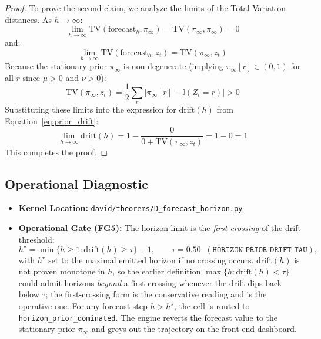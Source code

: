 \documentclass[11pt,a4paper]{article}
\begin{document}
\begin{proof}
To prove the second claim, we analyze the limits of the Total Variation distances. As $h \to \infty$:
\[
\lim_{h \to \infty} \text{TV}(\text{forecast}_h, \pi_\infty) = \text{TV}(\pi_\infty, \pi_\infty) = 0
\]
and:
\[
\lim_{h \to \infty} \text{TV}(\text{forecast}_h, z_t) = \text{TV}(\pi_\infty, z_t)
\]
Because the stationary prior $\pi_\infty$ is non-degenerate (implying $\pi_\infty[r] \in (0, 1)$ for all $r$ since $\mu > 0$ and $\nu > 0$):
\[
\text{TV}(\pi_\infty, z_t) = \frac{1}{2} \sum_{r} |\pi_\infty[r] - \mathbb{I}(Z_t=r)| > 0
\]
Substituting these limits into the expression for $\text{drift}(h)$ from Equation~\eqref{eq:prior_drift}:
\[
\lim_{h \to \infty} \text{drift}(h) = 1 - \frac{0}{0 + \text{TV}(\pi_\infty, z_t)} = 1 - 0 = 1
\]
This completes the proof.
\end{proof}

\subsection{Operational Diagnostic}
\begin{itemize}
    \item \textbf{Kernel Location:} \href{file:///Users/arbenlila/development/david/canonical/david/theorems/D_forecast_horizon.py}{\texttt{david/theorems/D\_forecast\_horizon.py}}
    \item \textbf{Operational Gate (FG5):} The horizon limit is the \emph{first crossing} of the drift threshold: %
    \[
    h^\star = \min\{ h \ge 1 : \text{drift}(h) \ge \tau \} - 1, \qquad \tau = 0.50 \;\; (\texttt{HORIZON\_PRIOR\_DRIFT\_TAU}), %
    \]
    with $h^\star$ set to the maximal emitted horizon if no crossing occurs. $\text{drift}(h)$ is not proven monotone in $h$, so the earlier definition $\max\{h : \text{drift}(h) < \tau\}$ could admit horizons \emph{beyond} a first crossing whenever the drift dips back below $\tau$; the first-crossing form is the conservative reading and is the operative one. %
    For any forecast step $h > h^\star$, the cell is routed to \texttt{horizon\_prior\_dominated}. The engine reverts the forecast value to the stationary prior $\pi_\infty$ and greys out the trajectory on the front-end dashboard.
\end{itemize}
\end{document}
